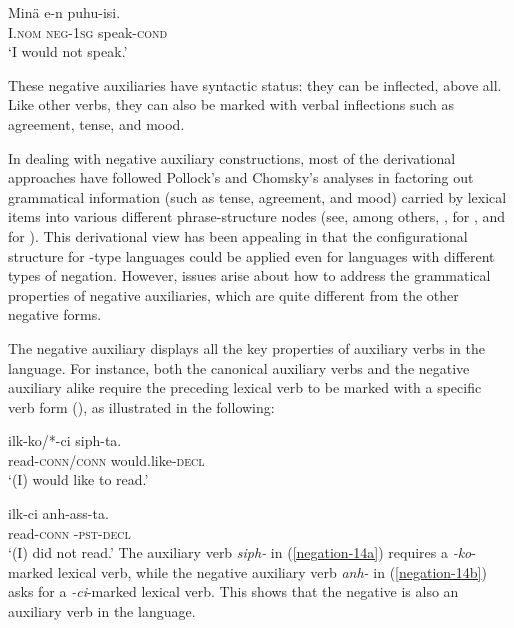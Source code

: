 \documentclass[output=paper
 	        ,biblatex
                ,babelshorthands
                ,newtxmath
                ,draftmode
                ,colorlinks, citecolor=brown
]{langscibook}
\begin{document}
\begin{exe}
\begin{xlist}
\begin{exe}
\begin{xlist}
\ea
\gll Min\"{a} e-n puhu-isi. \\
     I.\textsc{nom} \textsc{neg}-\textsc{1sg} speak-\textsc{cond} \\
\glt `I would not speak.'
\z

\noindent
These negative auxiliaries have syntactic status: they can be
inflected, above all. Like other verbs, they can also be marked
with verbal inflections such as agreement, tense, and mood.

In dealing with negative auxiliary constructions,
most of the derivational approaches have
followed Pollock's and Chomsky's analyses in factoring out grammatical
information (such as tense, agreement, and mood) carried by lexical items into various different phrase-structure nodes (see, among others, \citealt{Hagstrom:02}, \citealt{Han:07} for , and \citealt{Vasishth:00} for ).
This derivational view has
been appealing in that the configurational structure for -type
languages could be applied even for languages with different types
of negation. However, issues arise about how to address the grammatical
properties of negative auxiliaries, which are quite different from the
other negative forms.
%
%
%
%

%


%
The  negative auxiliary displays all the key properties of auxiliary verbs in the language. For instance, both the canonical auxiliary verbs and
the negative auxiliary alike require the preceding lexical verb to be marked with a specific verb form (\vform), as illustrated
in the following:

\eal
\ex\label{negation-14a}
\gll ilk-ko/*-ci siph-ta. \\
     read-\textsc{conn}/\textsc{conn} would.like-\textsc{decl} \\
\glt `(I) would like to read.'

\ex\label{negation-14b}
\gll ilk-ci anh-ass-ta. \\
     read-\textsc{conn} \NEG-\textsc{pst}-\textsc{decl} \\
\glt `(I) did not read.'
\zl
\noindent
The auxiliary verb \textit{siph-} in (\ref{negation-14a}) requires a
\textit{-ko}-marked lexical verb, while the negative auxiliary
 verb \textit{anh-} in (\ref{negation-14b}) asks for a \textit{-ci}-marked lexical
 verb. This shows that the negative is also an auxiliary verb in the language.


\end{xlist}
\end{exe}
\end{xlist}
\end{exe}
\end{document}
